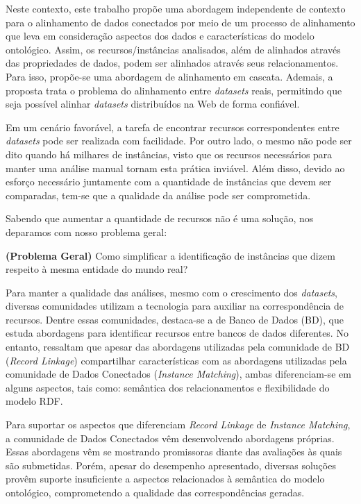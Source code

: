 Neste contexto, este trabalho propõe uma abordagem independente de contexto para o alinhamento de dados conectados por meio de um processo de alinhamento que leva em consideração aspectos dos dados e  características do modelo ontológico.
Assim, os recursos/instâncias analisados, além de alinhados através das propriedades de dados, podem ser alinhados através seus relacionamentos. Para isso, propõe-se uma abordagem de alinhamento em cascata. Ademais, a proposta trata o problema do alinhamento entre \textit{datasets} reais, permitindo que seja possível alinhar \textit{datasets} distribuídos na Web de forma confiável.


Em um cenário favorável, a tarefa de encontrar recursos correspondentes entre \textit{datasets} pode ser realizada com facilidade. Por outro lado, o mesmo não pode ser dito quando há milhares de instâncias, visto que os recursos necessários para manter uma análise manual tornam esta prática inviável. Além disso, devido ao esforço necessário juntamente com a quantidade de instâncias que devem ser comparadas, tem-se que a qualidade da análise pode ser comprometida.

Sabendo que aumentar a quantidade de recursos não é uma solução, nos deparamos com nosso problema geral:

\textbf{(Problema Geral)} Como simplificar a identificação de instâncias que dizem respeito à mesma entidade do mundo real?

Para manter a qualidade das análises, mesmo com o crescimento dos \textit{datasets}, diversas comunidades utilizam a tecnologia para auxiliar na correspondência de recursos. Dentre essas comunidades, destaca-se a de Banco de Dados (BD), que estuda abordagens para identificar recursos entre bancos de dados diferentes. No entanto,  ressaltam que apesar das abordagens utilizadas pela comunidade de BD (\textit{Record Linkage}) compartilhar características com as abordagens utilizadas pela comunidade de Dados Conectados (\textit{Instance Matching}), ambas diferenciam-se em alguns aspectos, tais como: semântica dos relacionamentos e flexibilidade do modelo RDF.

Para suportar os aspectos que diferenciam \textit{Record Linkage} de \textit{Instance Matching}, a comunidade de Dados Conectados vêm desenvolvendo abordagens próprias. Essas abordagens vêm se mostrando promissoras diante das avaliações às quais são submetidas. Porém, apesar do desempenho apresentado, diversas soluções provêm suporte insuficiente a aspectos relacionados à semântica do modelo ontológico, comprometendo a qualidade das correspondências geradas.

